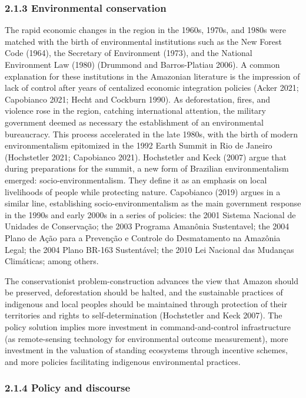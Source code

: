 \documentclass[
]{article}
\begin{document}
\hypertarget{environmental-conservation}{%
\subsubsection{2.1.3 Environmental
conservation}\label{environmental-conservation}}

The rapid economic changes in the region in the 1960s, 1970s, and 1980s
were matched with the birth of environmental institutions such as the
New Forest Code (1964), the Secretary of Environment (1973), and the
National Environment Law (1980) (Drummond and Barros-Platiau 2006). A
common explanation for these institutions in the Amazonian literature is
the impression of lack of control after years of centalized economic
integration policies (Acker 2021; Capobianco 2021; Hecht and Cockburn
1990). As deforestation, fires, and violence rose in the region,
catching international attention, the military government deemed as
necessary the establishment of an environmental bureaucracy. This
process accelerated in the late 1980s, with the birth of modern
environmentalism epitomized in the 1992 Earth Summit in Rio de Janeiro
(Hochstetler 2021; Capobianco 2021). Hochstetler and Keck (2007) argue
that during preparations for the summit, a new form of Brazilian
environmentalism emerged: socio-environmentalism. They define it as an
emphasis on local livelihoods of people while protecting nature.
Capobianco (2019) argues in a similar line, establishing
socio-environmentalism as the main government response in the 1990s and
early 2000s in a series of policies: the 2001 Sistema Nacional de
Unidades de Conservação; the 2003 Programa Amanônia Sustentavel; the
2004 Plano de Ação para a Prevenção e Controle do Desmatamento na
Amazônia Legal; the 2004 Plano BR-163 Sustentável; the 2010 Lei Nacional
das Mudanças Climáticas; among others.

The conservationist problem-construction advances the view that Amazon
should be preserved, deforestation should be halted, and the sustainable
practices of indigenous and local peoples should be maintained through
protection of their territories and rights to self-determination
(Hochstetler and Keck 2007). The policy solution implies more investment
in command-and-control infrastructure (as remote-sensing technology for
environmental outcome measurement), more investment in the valuation of
standing ecosystems through incentive schemes, and more policies
facilitating indigenous environmental practices.

\hypertarget{policy-and-discourse}{%
\subsubsection{2.1.4 Policy and discourse}\label{policy-and-discourse}}
\end{document}
